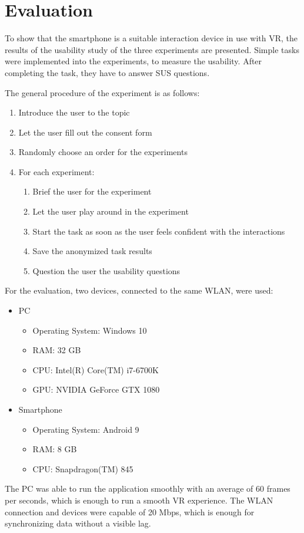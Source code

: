 \chapter{Evaluation}\label{chapter:evaluation}

To show that the smartphone is a suitable interaction device in use with \ac{VR}, the results of the usability study of the three experiments are presented. Simple tasks were implemented into the experiments, to measure the usability. After completing the task, they have to answer \ac{SUS} questions.

The general procedure of the experiment is as follows:
\begin{enumerate}
  \item Introduce the user to the topic
  \item Let the user fill out the consent form
  \item Randomly choose an order for the experiments
  \item For each experiment:
  \begin{enumerate}
  \item Brief the user for the experiment
  \item Let the user play around in the experiment
  \item Start the task as soon as the user feels confident with the interactions
  \item Save the anonymized task results
  \item Question the user the usability questions
  \end{enumerate}
\end{enumerate}

For the evaluation, two devices, connected to the same \ac{WLAN}, were used:
\begin{itemize}
  \item \ac{PC}
  \begin{itemize}
    \item Operating System: Windows 10
    \item RAM: 32 GB
    \item CPU: Intel(R) Core(TM) i7-6700K %
    \item GPU: NVIDIA GeForce GTX 1080  
  \end{itemize}
  \item Smartphone
  \begin{itemize}
    \item Operating System: Android 9
    \item RAM: 8 GB
    \item CPU: Snapdragon(TM) 845 %
  \end{itemize}
\end{itemize}

The \ac{PC} was able to run the application smoothly with an average of 60 frames per seconds, which is enough to run a smooth \ac{VR} experience. The \ac{WLAN} connection and devices were capable of 20 Mbps, which is enough for synchronizing data without a visible lag.